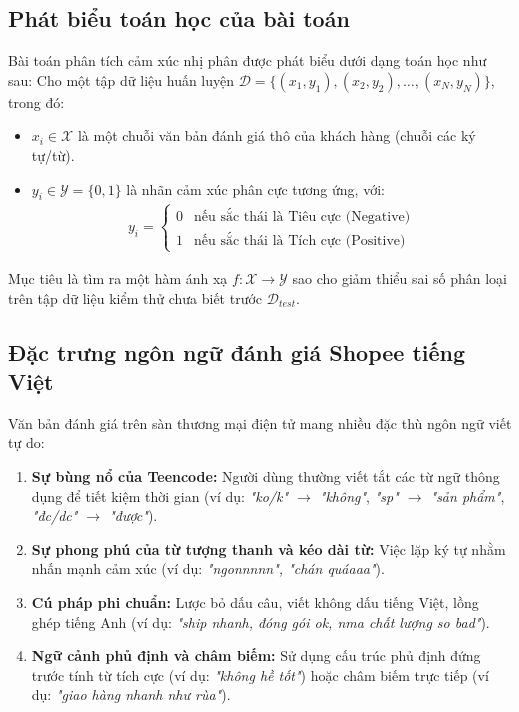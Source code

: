 \documentclass[12pt,a4paper]{article}
\begin{document}
\subsection{Phát biểu toán học của bài toán}
Bài toán phân tích cảm xúc nhị phân được phát biểu dưới dạng toán học như sau:
Cho một tập dữ liệu huấn luyện $\mathcal{D} = \{(x_1, y_1), (x_2, y_2), \dots, (x_N, y_N)\}$, trong đó:
\begin{itemize}
    \item $x_i \in \mathcal{X}$ là một chuỗi văn bản đánh giá thô của khách hàng (chuỗi các ký tự/từ).
    \item $y_i \in \mathcal{Y} = \{0, 1\}$ là nhãn cảm xúc phân cực tương ứng, với:
    \begin{align}
        y_i = \begin{cases} 
            0 & \text{nếu sắc thái là Tiêu cực (Negative)} \\
            1 & \text{nếu sắc thái là Tích cực (Positive)} 
        \end{cases}
    \end{align}
\end{itemize}
Mục tiêu là tìm ra một hàm ánh xạ $f: \mathcal{X} \rightarrow \mathcal{Y}$ sao cho giảm thiểu sai số phân loại trên tập dữ liệu kiểm thử chưa biết trước $\mathcal{D}_{test}$.

\subsection{Đặc trưng ngôn ngữ đánh giá Shopee tiếng Việt}
Văn bản đánh giá trên sàn thương mại điện tử mang nhiều đặc thù ngôn ngữ viết tự do:
\begin{enumerate}
    \item \textbf{Sự bùng nổ của Teencode:} Người dùng thường viết tắt các từ ngữ thông dụng để tiết kiệm thời gian (ví dụ: \textit{"ko/k" $\rightarrow$ "không"}, \textit{"sp" $\rightarrow$ "sản phẩm"}, \textit{"đc/dc" $\rightarrow$ "được"}).
    \item \textbf{Sự phong phú của từ tượng thanh và kéo dài từ:} Việc lặp ký tự nhằm nhấn mạnh cảm xúc (ví dụ: \textit{"ngonnnnn", "chán quáaaa"}).
    \item \textbf{Cú pháp phi chuẩn:} Lược bỏ dấu câu, viết không dấu tiếng Việt, lồng ghép tiếng Anh (ví dụ: \textit{"ship nhanh, đóng gói ok, nma chất lượng so bad"}).
    \item \textbf{Ngữ cảnh phủ định và châm biếm:} Sử dụng cấu trúc phủ định đứng trước tính từ tích cực (ví dụ: \textit{"không hề tốt"}) hoặc châm biếm trực tiếp (ví dụ: \textit{"giao hàng nhanh như rùa"}).
\end{enumerate}
\end{document}

